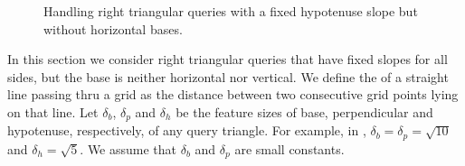\begin{figure}[t!]
\centering
{}
\hfill
\hfill
{}
\caption{Handling right triangular queries with a fixed hypotenuse slope but without horizontal bases.}
\label{fig:rotated-right-triangle}
\end{figure}


%
In this section we consider right triangular queries that have fixed
slopes for all sides, but the base is neither horizontal nor vertical.
We define the  of a straight line passing thru a
grid as the distance between two consecutive grid points lying on that
line. Let $\delta_b$, $\delta_p$ and $\delta_h$ be the feature sizes
of base, perpendicular and hypotenuse, respectively, of any query
triangle. For example, in ,
$\delta_b = \delta_p = \sqrt{10}$ and $\delta_h = \sqrt{5}$. We assume
that $\delta_b$ and $\delta_p$ are small constants.

